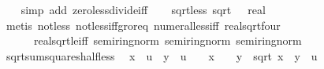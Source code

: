 \begin{isabellebody}
\ \ \isamarkupfalse%
\ {\isacharparenleft}{\kern0pt}simp\ add{\isacharcolon}{\kern0pt}\ zero{\isacharunderscore}{\kern0pt}less{\isacharunderscore}{\kern0pt}divide{\isacharunderscore}{\kern0pt}iff{\isacharparenright}{\kern0pt}\isanewline
\ \ \isamarkupfalse%
%
\endisatagproof
{\isafoldproof}%
%
\isadelimproof
\isanewline
%
\endisadelimproof
\isanewline
{}\isamarkupfalse%
\ sqrt{}{\isacharunderscore}{\kern0pt}less{\isacharunderscore}{\kern0pt}{}{\isacharcolon}{\kern0pt}\ {\isachardoublequoteopen}sqrt\ {}\ {\isacharless}{\kern0pt}\ {\isacharparenleft}{\kern0pt}{}{\isacharcolon}{\kern0pt}{\isacharcolon}{\kern0pt}real{\isacharparenright}{\kern0pt}{\isachardoublequoteclose}\isanewline
%
\isadelimproof
\ \ %
\endisadelimproof
%
\isatagproof
{}\isamarkupfalse%
\ {\isacharparenleft}{\kern0pt}metis\ not{\isacharunderscore}{\kern0pt}less\ not{\isacharunderscore}{\kern0pt}less{\isacharunderscore}{\kern0pt}iff{\isacharunderscore}{\kern0pt}gr{\isacharunderscore}{\kern0pt}or{\isacharunderscore}{\kern0pt}eq\ numeral{\isacharunderscore}{\kern0pt}less{\isacharunderscore}{\kern0pt}iff\ real{\isacharunderscore}{\kern0pt}sqrt{\isacharunderscore}{\kern0pt}four\isanewline
\ \ \ \ \ \ real{\isacharunderscore}{\kern0pt}sqrt{\isacharunderscore}{\kern0pt}le{\isacharunderscore}{\kern0pt}iff\ semiring{\isacharunderscore}{\kern0pt}norm{\isacharparenleft}{\kern0pt}{}{}{\isacharparenright}{\kern0pt}\ semiring{\isacharunderscore}{\kern0pt}norm{\isacharparenleft}{\kern0pt}{}{}{\isacharparenright}{\kern0pt}\ semiring{\isacharunderscore}{\kern0pt}norm{\isacharparenleft}{\kern0pt}{}{}{\isacharparenright}{\kern0pt}{\isacharparenright}{\kern0pt}%
\endisatagproof
{\isafoldproof}%
%
\isadelimproof
\isanewline
%
\endisadelimproof
\isanewline
{}\isamarkupfalse%
\ sqrt{\isacharunderscore}{\kern0pt}sum{\isacharunderscore}{\kern0pt}squares{\isacharunderscore}{\kern0pt}half{\isacharunderscore}{\kern0pt}less{\isacharcolon}{\kern0pt}\isanewline
\ \ {\isachardoublequoteopen}x\ {\isacharless}{\kern0pt}\ u{\isacharslash}{\kern0pt}{}\ {\isasymLongrightarrow}\ y\ {\isacharless}{\kern0pt}\ u{\isacharslash}{\kern0pt}{}\ {\isasymLongrightarrow}\ {}\ {\isasymle}\ x\ {\isasymLongrightarrow}\ {}\ {\isasymle}\ y\ {\isasymLongrightarrow}\ sqrt\ {\isacharparenleft}{\kern0pt}x\ {\isacharplus}{\kern0pt}\ y\ {\isacharless}{\kern0pt}\ u{\isachardoublequoteclose}\isanewline

\end{isabellebody}
